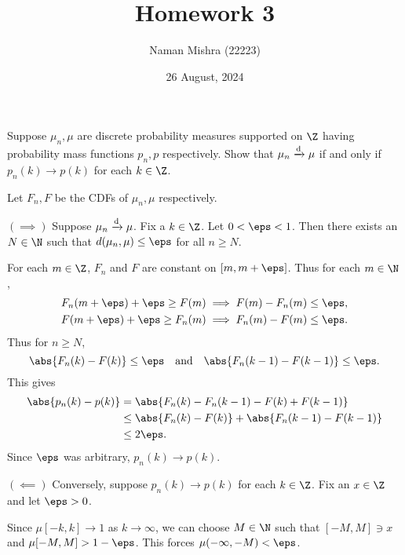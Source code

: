 \documentclass[12pt]{article}
\title{Homework 3}
\author{Naman Mishra (22223)}
\date{26 August, 2024}
\begin{document}
\maketitle

\begin{problem*}
    Suppose $\mu_n, \mu$ are discrete probability measures supported on
    $\Z$ having probability mass functions $p_n, p$ respectively.
    Show that $\mu_n \xrightarrow{\text{d}} \mu$ if and only if $p_n(k) \to p(k)$
    for each $k \in \Z$.
\end{problem*}
\begin{solution}
    Let $F_n, F$ be the CDFs of $\mu_n, \mu$ respectively.

    \noindent $\bm{(\!\implies\!)}$ Suppose $\mu_n \xrightarrow{\text{d}} \mu$.
    Fix a $k \in \Z$.
    Let $0 < \eps < 1$.
    Then there exists an $N \in \N$ such that
    $d(\mu_n, \mu) \le \eps$ for all $n \ge N$.

    For each $m \in \Z$, $F_n$ and $F$ are constant on $[m, m+\eps]$.
    Thus for each $m \in \N$,
    \begin{align*}
        F_n(m + \eps) + \eps \ge F(m) &\implies F(m) - F_n(m) \le \eps, \\
        F(m + \eps) + \eps \ge F_n(m) &\implies F_n(m) - F(m) \le \eps.
    \end{align*}
    Thus for $n \ge N$, \[
        \abs{F_n(k) - F(k)} \le \eps
        \quad \text{and} \quad
        \abs{F_n(k-1) - F(k-1)} \le \eps.
    \]
    This gives \begin{align*}
        \abs{p_n(k) - p(k)} &= \abs{F_n(k) - F_n(k-1) - F(k) + F(k-1)} \\
        &\le \abs{F_n(k) - F(k)} + \abs{F_n(k-1) - F(k-1)} \\
        &\le 2\eps.
    \end{align*} Since $\eps$ was arbitrary, $p_n(k) \to p(k)$.
    \vspace{1em}%

    \noindent $\bm{(\!\impliedby\!)}$
    Conversely, suppose $p_n(k) \to p(k)$ for each $k \in \Z$.
    Fix an $x \in \Z$ and let $\eps > 0$.

    Since $\mu[-k, k] \to 1$ as $k \to \infty$, we can choose $M \in \N$
    such that $[-M, M] \ni x$ and $\mu[-M, M] > 1 - \eps$.
    This forces $\mu(-\infty, -M) < \eps$.


\end{solution}
\end{document}
